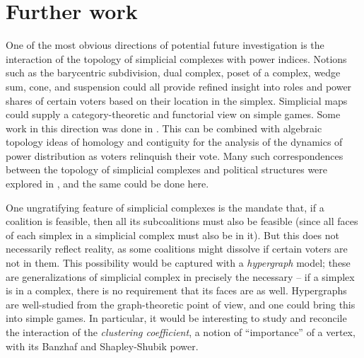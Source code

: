 \documentclass[11pt]{amsart}
\theoremstyle{plain}
\theoremstyle{definition}
\theoremstyle{remark}
\begin{document}
%
%
%
%
%
%
%



\section{Further work}\label{S:FurtherResearch}

One of the most obvious directions of potential future investigation is the interaction of the topology of simplicial complexes with power indices. Notions such as the barycentric subdivision, dual complex, poset of a complex, wedge sum, cone, and suspension could all provide refined insight into roles and power shares of certain voters based on their location in the simplex. Simplicial maps could supply a category-theoretic and functorial view on simple games. Some work in this direction was done in \cite{MT:MathGames}. This can be combined with algebraic topology ideas of homology and contiguity for the analysis of the dynamics of power distribution as voters relinquish their vote.  Many such correspondences between the topology of simplicial complexes and political structures were explored in \cite{MV:Politics}, and the same could be done here.

One ungratifying feature of simplicial complexes is the mandate that, if a coalition is feasible, then all its subcoalitions must also be feasible (since all faces of each simplex in a simplicial complex must also be in it). But this does not necessarily reflect reality, as some coalitions might dissolve if certain voters are not in them. This possibility would be captured with a \emph{hypergraph} model; these are generalizations of simplicial complex in precisely the necessary -- if a simplex is in a complex, there is no requirement that its faces are as well. Hypergraphs are well-studied from the graph-theoretic point of view, and one could bring this into simple games. In particular, it would be interesting to study and reconcile the interaction of the \emph{clustering coefficient}, a notion of ``importance'' of a vertex, with its Banzhaf and Shapley-Shubik power.
\end{document}
